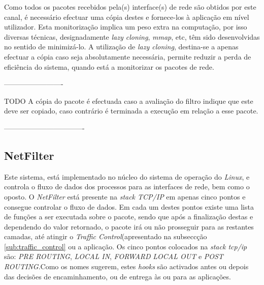  

Como todos os pacotes recebidos pela(s) interface(s) de rede são obtidos por este canal, é necessário efectuar uma cópia destes e fornece-los à aplicação em nível utilizador.
Esta monitorização implica um peso extra na computação, por isso diversas técnicas, designadamente \textit{lazy cloning}, \textit{mmap}, etc, têm sido desenvolvidas no sentido de minimizá-lo.
A utilização de \textit{lazy cloning}, destina-se a apenas efectuar a cópia caso seja absolutamente necessária, permite reduzir a perda de eficiência do sistema, quando está a monitorizar os pacotes de rede.

-------------------------

TODO
A cópia do pacote é efectuada caso a avaliação do filtro indique que este deve ser copiado, caso contrário é terminada a execução em relação a esse pacote.

----------------------------------



\subsection{NetFilter}


Este sistema, está implementado no núcleo do sistema de operação do \textit{Linux}, e controla o fluxo de dados dos processos para as interfaces de rede, bem como o oposto.
O \textit{NetFilter} está presente na \textit{stack TCP/IP} em apenas cinco pontos e consegue controlar o fluxo de dados.
Em cada um destes pontos existe uma lista de funções a ser executada sobre o pacote, sendo que após a finalização destas e dependendo do valor retornado, o pacote irá ou não prosseguir para as restantes camadas, até atingir o \textit{Traffic Control}(apresentado na subseccção \ref{sub:traffic_control} ou a aplicação.
Os cinco pontos colocados na \textit{stack tcp/ip} são: \textit{PRE ROUTING}, \textit{LOCAL IN}, \textit{FORWARD} \textit{LOCAL OUT} e \textit{POST ROUTING}.Como os nomes sugerem, estes \textit{hooks} são activados antes ou depois das decisões de encaminhamento, ou de entrega às ou para as aplicações.

